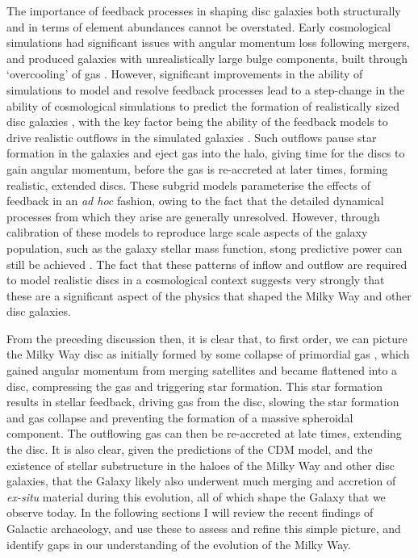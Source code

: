 The importance of feedback processes in shaping disc galaxies both structurally and in terms of element abundances cannot be overstated. Early cosmological simulations had significant issues with angular momentum loss following mergers, and produced galaxies with unrealistically large bulge components, built through `overcooling' of gas \citep[e.g.][]{1994MNRAS.267..401N}. However, significant improvements in the ability of simulations to model and resolve feedback processes lead to a step-change in the ability of cosmological simulations to predict the formation of realistically sized disc galaxies \citep[e.g.][among many others]{2011ApJ...742...76G,2012MNRAS.426..690B,2012MNRAS.427..379M,2013MNRAS.436..625S,2014MNRAS.445..581H,2014MNRAS.442.2474M,2014MNRAS.443.2452M}, with the key factor being the ability of the feedback models to drive realistic outflows in the simulated galaxies \citep[e.g.][]{2008MNRAS.387.1431D,2008MNRAS.389.1137S}. Such outflows pause star formation in the galaxies and eject gas into the halo, giving time for the discs to gain angular momentum, before the gas is re-accreted at later times, forming realistic, extended discs. These subgrid models parameterise the effects of feedback in an \emph{ad hoc} fashion, owing to the fact that the detailed dynamical processes from which they arise are generally unresolved. However, through calibration of these models to reproduce large scale aspects of the galaxy population, such as the galaxy stellar mass function, stong predictive power can still be achieved \citep[good discussions of this are given in][]{2015MNRAS.446..521S,2015MNRAS.450.1937C}. The fact that these patterns of inflow and outflow are required to model realistic discs in a cosmological context suggests very strongly that these are a significant aspect of the physics that shaped the Milky Way and other disc galaxies.

From the preceding discussion then, it is clear that, to first order, we can picture the Milky Way disc as initially formed by some collapse of primordial gas \citep[as in][]{1962ApJ...136..748E}, which gained angular momentum from merging satellites \citep[e.g.][]{1978ApJ...225..357S} and became flattened into a disc, compressing the gas and triggering star formation. This star formation results in stellar feedback, driving gas from the disc, slowing the star formation and gas collapse and preventing the formation of a massive spheroidal component. The outflowing gas can then be re-accreted at late times, extending the disc. It is also clear, given the predictions of the CDM model, and the existence of stellar substructure in the haloes of the Milky Way and other disc galaxies, that the Galaxy likely also underwent much merging and accretion of \emph{ex-situ} material during this evolution, all of which shape the Galaxy that we observe today. In the following sections I will review the recent findings of Galactic archaeology, and use these to assess and refine this simple picture, and identify gaps in our understanding of the evolution of the Milky Way.

